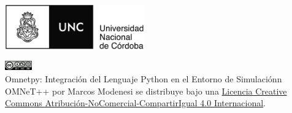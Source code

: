 \begin{titlepage}
    \begin{center}
        \large  

        \hfill

        \begingroup
            \huge
            \textbf{\textsf{ \myTitle{}}} \\ \bigskip
        \endgroup

        \myName{}

        \vfill


        \mySubtitle{} \\

        \bigskip   

        \myFaculty{} \\

        \bigskip   

        \myDirectors{} \\

        \vfill                      
        \includegraphics[width=6cm]{images/unc} \\ \medskip
        \bigskip   
        \myTime{}

        \bigskip
        \vfill
        \begingroup
            \includegraphics[width=44px]{images/licence} \\ \medskip
            \scriptsize
            Omnetpy: Integración del Lenguaje Python en el Entorno de
            Simulaciónn OMNeT++ \linebreak por Marcos Modenesi se distribuye
            bajo una \linebreak
            \href{https://creativecommons.org/licenses/by-nc-sa/4.0/}{Licencia
            Creative Commons Atribución-NoComercial-CompartirIgual 4.0
            Internacional}.\\
        \endgroup


    \end{center}  
\end{titlepage}   
